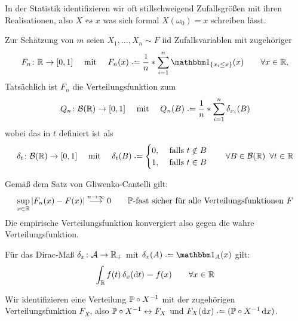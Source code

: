 	In der Statistik identifizieren wir oft stillschweigend Zufallsgrößen mit ihren Realisationen, also $X \leftrightsquigarrow x$ was sich formal $X(\omega_0) = x$ schreiben lässt.

Zur Schätzung von $m$ seien $X_1,\dots, X_n \sim F$ iid Zufallsvariablen mit zugehöriger 
\begin{equation*}
	F_n \colon \R \to [0,1] 
	\quad \text{ mit } \quad
	F_n(x) \defeq \frac{1}{n} * \sum_{i=1}^n \one_{\menge{ x_i \le x}}(x) \qquad \forall x \in \R.
\end{equation*}
Tatsächlich ist $F_n$ die Verteilungsfunktion zum 
\begin{equation*}
	Q_n \colon \borel\R \to [0,1]
	\quad \text{ mit } \quad
	Q_n(B)\defeq\frac{1}{n}*\sum_{i=1}^n\delta_{x_i}(B)
\end{equation*}
wobei das  in $t$ definiert ist als
\begin{equation*}
	\delta_t \colon \borel\R \to [0,1]
	\quad \text{ mit } \quad
	\delta_t(B) \defeq
	\begin{cases}
		0, &\falls t \notin B \\
		1, &\falls t \in B
	\end{cases}
	\qquad\forall B \in \borel\R \enskip \forall t \in \R
\end{equation*}

Gemäß dem Satz von Gliwenko-Cantelli gilt:
\begin{equation*}
	\sup_{x \in \R} \abs{F_n(x)-F(x)} \overset{n \to \infty}{\longrightarrow} 0 \qquad \P\text{-fast sicher für alle Verteilungsfunktionen } F
\end{equation*}
Die empirische Verteilungsfunktion konvergiert also gegen die wahre Verteilungsfunktion.

\begin{*erinnerung}
	Für das Dirac-Maß $\delta_x \colon \A \to \R_+$ mit $\delta_x(A) \defeq \one_A(x)$ gilt:
	\begin{equation}\label{eq: dirac}
		\int_\R f(t) \, \delta_x(\diff{t}) = f(x) \qquad \forall x \in \R
	\end{equation}
\end{*erinnerung}

\begin{*notation}
	Wir identifizieren eine Verteilung $\P\circ X^{-1}$ mit der zugehörigen Verteilungsfunktion $F_X$, also $\P \circ X^{-1} \leftrightarrow F_X$ und $F_X(\dx) \defeq (\P\circ X^{-1} \, \dx)$.
\end{*notation}


